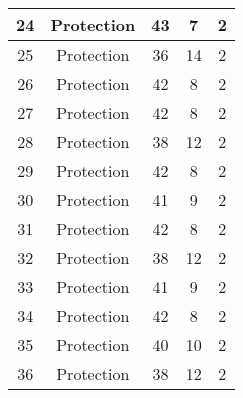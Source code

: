 \documentclass[results.tex]{subfiles}
\begin{document}
\begin{center}
\begin{tabular}{| c || c | c | c | c |}
            \hline
            24                      & Protection                   & 43                     & 7                       & 2                    \\
            \hline
            25                      & Protection                   & 36                     & 14                      & 2                    \\
            \hline
            26                      & Protection                   & 42                     & 8                       & 2                    \\
            \hline
            27                      & Protection                   & 42                     & 8                       & 2                    \\
            \hline
            28                      & Protection                   & 38                     & 12                      & 2                    \\
            \hline
            29                      & Protection                   & 42                     & 8                       & 2                    \\
            \hline
            30                      & Protection                   & 41                     & 9                       & 2                    \\
            \hline
            31                      & Protection                   & 42                     & 8                       & 2                    \\
            \hline
            32                      & Protection                   & 38                     & 12                      & 2                    \\
            \hline
            33                      & Protection                   & 41                     & 9                       & 2                    \\
            \hline
            34                      & Protection                   & 42                     & 8                       & 2                    \\
            \hline
            35                      & Protection                   & 40                     & 10                      & 2                    \\
            \hline
            36                      & Protection                   & 38                     & 12                      & 2                    \\

\end{tabular}
\end{center}
\end{document}
